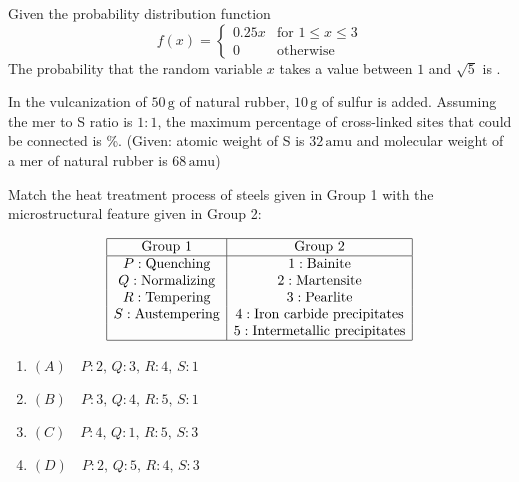     \bigskip

    \item Given the probability distribution function
    \[
    f(x) = 
    \begin{cases} 
      0.25x & \text{for } 1 \leq x \leq 3 \\
      0 & \text{otherwise}
    \end{cases}
    \]
    The probability that the random variable $x$ takes a value between $1$ and $\sqrt{5}$ is \underline{\hspace{1cm}}.
    
    \bigskip

    \item In the vulcanization of $50 \, \text{g}$ of natural rubber, $10 \, \text{g}$ of sulfur is added. Assuming the mer to S ratio is $1:1$, the maximum percentage of cross-linked sites that could be connected is \underline{\hspace{1cm}} \%. (Given: atomic weight of S is $32 \, \text{amu}$ and molecular weight of a mer of natural rubber is $68 \, \text{amu}$)
    
    \bigskip

    \item Match the heat treatment process of steels given in Group 1 with the microstructural feature given in Group 2:
    
    \[
    \begin{array}{|c|c|}
    \hline
    \text{Group 1} & \text{Group 2} \\
    \hline
    P: \text{Quenching} & 1: \text{Bainite} \\
    Q: \text{Normalizing} & 2: \text{Martensite} \\
    R: \text{Tempering} & 3: \text{Pearlite} \\
    S: \text{Austempering} & 4: \text{Iron carbide precipitates} \\
    & 5: \text{Intermetallic precipitates} \\
    \hline
    \end{array}
    \]
    
    \begin{enumerate}
        \item $(A) \quad P: 2, \, Q: 3, \, R: 4, \, S: 1$
        \item $(B) \quad P: 3, \, Q: 4, \, R: 5, \, S: 1$
        \item $(C) \quad P: 4, \, Q: 1, \, R: 5, \, S: 3$
        \item $(D) \quad P: 2, \, Q: 5, \, R: 4, \, S: 3$
    \end{enumerate}
    
